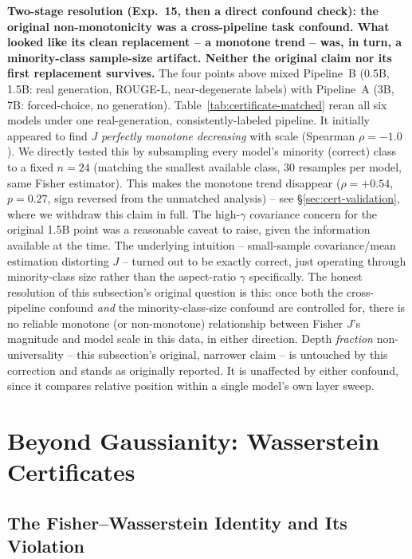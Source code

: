 \documentclass[10pt,twocolumn]{article}
\newcommand{\FloatBarrier}{\clearpage}
\begin{document}
\textbf{Two-stage resolution (Exp.~15, then a direct confound check):
the original non-monotonicity was a cross-pipeline task confound. What
looked like its clean replacement -- a monotone trend -- was, in turn, a
minority-class sample-size artifact. Neither the original claim nor its
first replacement survives.} The four points above mixed Pipeline~B
(0.5B, 1.5B: real generation, ROUGE-L, near-degenerate labels) with
Pipeline~A (3B, 7B: forced-choice, no generation). Table~\ref{tab:certificate-matched}
reran all six models under one real-generation, consistently-labeled
pipeline. It initially appeared to find $J$ \emph{perfectly monotone
decreasing} with scale (Spearman $\rho=-1.0$). We directly tested this
by subsampling every model's minority (correct) class to a fixed
$n=24$ (matching the smallest available class, 30 resamples per model,
same Fisher estimator). This makes the monotone trend disappear
($\rho=+0.54$, $p=0.27$, sign reversed from the unmatched analysis) --
see \S\ref{sec:cert-validation}, where we withdraw this claim in full.
The high-$\gamma$ covariance concern for the original 1.5B point was a
reasonable caveat to raise, given the information available at the
time. The underlying intuition -- small-sample covariance/mean
estimation distorting $J$ -- turned out to be exactly correct, just
operating through minority-class size rather than the aspect-ratio
$\gamma$ specifically. The honest resolution of this subsection's
original question is this: once both the cross-pipeline confound
\emph{and} the minority-class-size confound are controlled for, there
is no reliable monotone (or non-monotone) relationship between Fisher
$J$'s magnitude and model scale in this data, in either direction.
Depth \emph{fraction} non-universality -- this subsection's original,
narrower claim -- is untouched by this correction and stands as
originally reported. It is unaffected by either confound, since it
compares relative position within a single model's own layer sweep.

\FloatBarrier
\section{Beyond Gaussianity: Wasserstein Certificates}
\label{sec:ot}

\subsection{The Fisher--Wasserstein Identity and Its Violation}
\label{sec:ot-identity}
\end{document}
